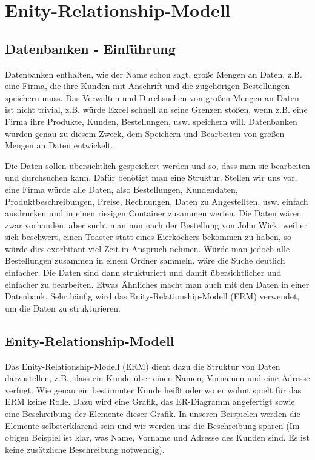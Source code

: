 \section[Enity-Relationship-Modell]{Enity-Relationship-Modell}
\subsection[Datenbanken]{Datenbanken - Einführung}
Datenbanken enthalten, wie der Name schon sagt, große Mengen an Daten, z.B. eine Firma, die ihre Kunden mit Anschrift und die zugehörigen Bestellungen speichern muss. Das Verwalten und Durchsuchen von großen Mengen an Daten ist nicht trivial, z.B. würde Excel schnell an seine Grenzen stoßen, wenn z.B. eine Firma ihre Produkte, Kunden, Bestellungen, usw. speichern will. Datenbanken wurden genau zu diesem Zweck, dem Speichern und Bearbeiten von großen Mengen an Daten entwickelt.

Die Daten sollen übersichtlich gespeichert werden und so, dass man sie bearbeiten und durchsuchen kann. Dafür benötigt man eine Struktur. Stellen wir uns vor, eine Firma würde alle Daten, also Bestellungen, Kundendaten, Produktbeschreibungen, Preise, Rechnungen, Daten zu Angestellten, usw. einfach ausdrucken und in einen riesigen Container zusammen werfen. Die Daten wären zwar vorhanden, aber sucht man nun nach der Bestellung von John Wick, weil er sich beschwert, einen Toaster statt eines Eierkochers bekommen zu haben, so würde dies exorbitant viel Zeit in Anspruch nehmen. Würde man jedoch alle Bestellungen zusammen in einem Ordner sammeln, wäre die Suche deutlich einfacher. Die Daten sind dann strukturiert und damit übersichtlicher und einfacher zu bearbeiten. Etwas Ähnliches macht man auch mit den Daten in einer Datenbank. Sehr häufig wird das Enity-Relationship-Modell (ERM) verwendet, um die Daten zu strukturieren.
\subsection[Grundlagen]{Enity-Relationship-Modell}
Das Enity-Relationship-Modell (ERM) dient dazu die Struktur von Daten darzustellen, z.B., dass ein Kunde über einen Namen, Vornamen und eine Adresse verfügt. Wie genau ein bestimmter Kunde heißt oder wo er wohnt spielt für das ERM keine Rolle. Dazu wird eine Grafik, das ER-Diagramm angefertigt sowie eine Beschreibung der Elemente dieser Grafik. In unseren Beispielen werden die Elemente selbsterklärend sein und wir werden uns die Beschreibung sparen (Im obigen Beispiel ist klar, was Name, Vorname und Adresse des Kunden sind. Es ist keine zusätzliche Beschreibung notwendig).

